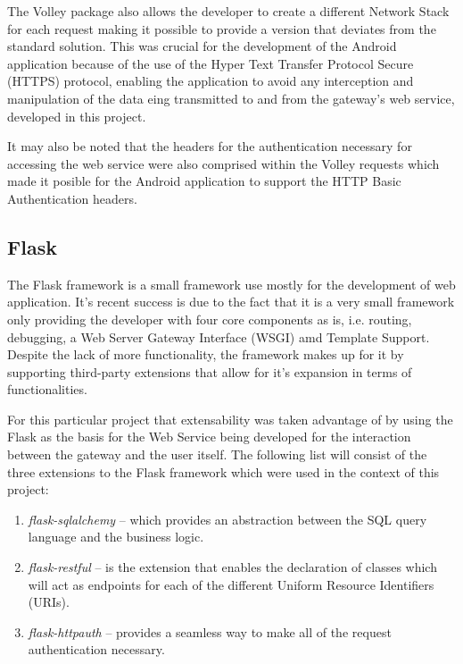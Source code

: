 The Volley package also allows the developer to create a different Network Stack
for each request making it possible to provide a version that deviates from the
standard solution. This was crucial for the development of the Android
application because of the use of the Hyper Text Transfer Protocol Secure
(HTTPS) protocol, enabling the application to avoid any interception and
manipulation of the data eing transmitted to and from the gateway's web service,
developed in this project.

It may also be noted that the headers for the authentication necessary for
accessing the web service were also comprised within the Volley requests which
made it posible for the Android application to support the HTTP Basic
Authentication headers.

\subsection{Flask}
\label{chap3:sec:tools:sub:flask}
The Flask framework is a small framework use mostly for the development of web
application. It's recent success is due to the fact that it is a very small
framework only providing the developer with four core components as is, i.e.
routing, debugging, a Web Server Gateway Interface (WSGI) amd Template Support.
Despite the lack of more functionality, the framework makes up for it by
supporting third-party extensions that allow for it's expansion in terms of
functionalities.

For this particular project that extensability was taken advantage of by using
the Flask as the basis for the Web Service being developed for the interaction
between the gateway and the user itself. The following list will consist of the
three extensions to the Flask framework which were used in the context of this
project:
\begin{enumerate}
	\item \emph{flask-sqlalchemy} -- which provides an abstraction between the
		SQL query language and the business logic.
	\item \emph{flask-restful} -- is the extension that enables the declaration
		of classes which will act as endpoints for each of the different Uniform
		Resource Identifiers (URIs).
	\item \emph{flask-httpauth} -- provides a seamless way to make all of the
		request authentication necessary.
\end{enumerate}



